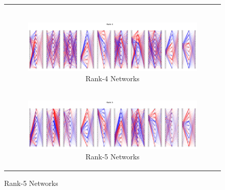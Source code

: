 \documentclass{article}
\theoremstyle{plain}
\theoremstyle{definition}
\theoremstyle{remark}
\begin{document}
\begin{figure}[ht]
\begin{minipage}{\textwidth}
\begin{tabular}{c}
\begin{subfigure}{0.3\textwidth}
            \end{subfigure} \\
            \begin{subfigure}{0.3\textwidth}
                \centering
                \includegraphics[width=\linewidth]{../figures/s6_high_rank_decompositions_rank4.pdf}
                \caption{Rank-4 Networks}
            \end{subfigure} \\
            \begin{subfigure}{0.3\textwidth}
                \centering
                \includegraphics[width=\linewidth]{../figures/s6_high_rank_decompositions_rank5.pdf}
                \caption{Rank-5 Networks}
            \end{subfigure}  
        \end{tabular}
    \end{minipage}

\end{figure}
\end{document}
